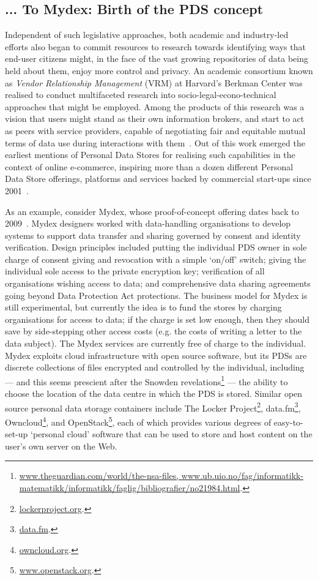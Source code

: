 \documentclass[graybox]{svmult}
\begin{document}
\subsection{... To Mydex: Birth of the PDS concept}

Independent of such legislative approaches, both academic and industry-led efforts also began to commit resources to research towards identifying ways that end-user citizens might, in the face of the vast growing repositories of data being held about them, enjoy more control and privacy. An academic consortium known as \emph{Vendor Relationship Management} (VRM) at Harvard's Berkman Center was realised to conduct multifaceted research into socio-legal-econo-technical approaches that might be employed.  Among the products of this research was a vision that users might stand as their own information brokers, and start to act as peers with service providers, capable of negotiating fair and equitable mutual terms of data use during interactions with them~\cite{agustin2001vendor}.  Out of this work emerged the earliest mentions of Personal Data Stores for realising such capabilities in the context of online e-commerce, inspiring more than a dozen different Personal Data Store offerings, platforms and services backed by commercial start-ups since 2001~\cite{ctrlshift}. 

As an example, consider Mydex, whose proof-of-concept offering dates back to 2009~\cite{heath2013}. Mydex designers worked with data-handling organisations to develop systems to support data transfer and sharing governed by consent and identity verification. Design principles included putting the individual PDS owner in sole charge of consent giving and revocation with a simple `on/off’ switch; giving the individual sole access to the private encryption key; verification of all organisations wishing access to data; and comprehensive data sharing agreements going beyond Data Protection Act protections. The business model for Mydex is still experimental, but currently the idea is to fund the stores by charging organisations for access to data; if the charge is set low enough, then they should save by side-stepping other access costs (e.g. the costs of writing a letter to the data subject). The Mydex services are currently free of charge to the individual. Mydex exploits cloud infrastructure with open source software, but  its PDSs are discrete collections of files encrypted and controlled by the individual, including --- and this seems prescient after the Snowden revelations\footnote{\url{www.theguardian.com/world/the-nsa-files, www.ub.uio.no/fag/informatikk-matematikk/informatikk/faglig/bibliografier/no21984.html}.} --- the ability to choose the location of the data centre in which the PDS is stored. Similar open source personal data storage containers include The Locker Project\footnote{\url{lockerproject.org}.}, data.fm\footnote{\url{data.fm}.}, Owncloud\footnote{\url{owncloud.org}.}, and OpenStack\footnote{\url{www.openstack.org}.}, each of which provides various degrees of easy-to-set-up `personal cloud’ software that can be used to
store and host content on the user's own server on the Web.
\end{document}
